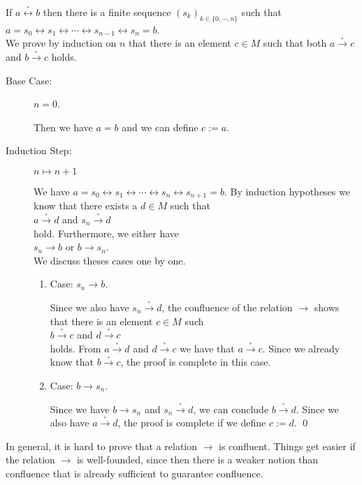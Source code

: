  \proof
If $a \stackrel{_*}{\leftrightarrow} b$ then there is a finite sequence $(s_k)_{k\in \{0,\cdots,n\}}$ such that
\\[0.2cm]
\hspace*{1.3cm}
$a = s_0 \leftrightarrow s_1 \leftrightarrow \cdots \leftrightarrow s_{n-1} \leftrightarrow s_n = b$.
\\[0.2cm]
We prove by induction on $n$ that there is an element $c \in M$ such that both $a \stackrel{_*}{\rightarrow} c$ and
$b \stackrel{_*}{\rightarrow} c$ holds.
\begin{description}
\item[Base Case:] $n = 0$.
  
      Then we have $a = b$ and we can define $c := a$.
\item[Induction Step:] $n \mapsto n+1$
      
      We have $a = s_0 \leftrightarrow s_1 \leftrightarrow \cdots \leftrightarrow s_{n} \leftrightarrow s_{n+1} = b$.
      By induction hypotheses we know that there exists a $d \in M$ such that
      \\[0.2cm]
      \hspace*{1.3cm}
      $a \stackrel{_*}{\rightarrow} d$ \quad and \quad $s_{n} \stackrel{_*}{\rightarrow} d$ 
      \\[0.2cm]
      hold.  Furthermore, we either have
      \\[0.2cm]
      \hspace*{1.3cm}
      $s_{n} \rightarrow b$ \quad or \quad $b \rightarrow s_{n}$.
      \\[0.2cm]
      We discuss theses cases one by one.
      \begin{enumerate}
      \item Case: $s_n \rightarrow b$.

        Since we also have $s_{n} \stackrel{_*}{\rightarrow} d$, the confluence of the relation $\rightarrow$ shows that
        there is an element $c \in M$ such 
        \\[0.2cm]
        \hspace*{1.3cm}
        $b \stackrel{_*}{\rightarrow} c$ \quad and \quad $d \stackrel{_*}{\rightarrow} c$ 
        \\[0.2cm]
        holds.  From $a \stackrel{_*}{\rightarrow} d$ and $d \stackrel{_*}{\rightarrow} c$ we have that $a \stackrel{_*}{\rightarrow} c$.  Since we already
        know that $b \stackrel{_*}{\rightarrow} c$, the proof is complete in this case. 
      \item Case: $b \rightarrow s_n$.

        Since we have $b \rightarrow s_n$ and $s_n \stackrel{_*}{\rightarrow} d$, we can conclude
        $b \stackrel{_*}{\rightarrow} d$.  Since we also have $a \stackrel{_*}{\rightarrow} d$, the proof is
        complete if we define $c := d$.  \qed
      \end{enumerate}
\end{description}
In general, it is hard to prove that a relation $\rightarrow$ is confluent.  Things get easier if the relation
$\rightarrow$ is well-founded, since then there is a weaker notion than confluence that is already sufficient
to guarantee confluence.

